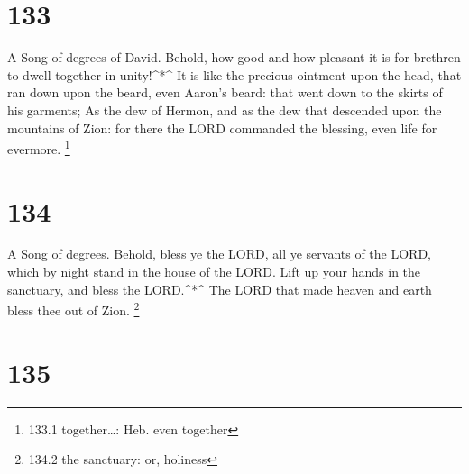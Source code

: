 \hypertarget{section-133}{%
\section{133}\label{section-133}}

A Song of degrees of David.  Behold, how good and how
pleasant it is for brethren to dwell together in unity!\^{}*\^{}
 It is like the precious ointment upon the head, that ran
down upon the beard, even Aaron's beard: that went down to the skirts of
his garments;  As the dew of Hermon, and as the dew that
descended upon the mountains of Zion: for there the LORD commanded the
blessing, even life for evermore. \footnote{133.1 together\ldots: Heb.
  even together}

\hypertarget{section-134}{%
\section{134}\label{section-134}}

A Song of degrees.  Behold, bless ye the LORD, all ye
servants of the LORD, which by night stand in the house of the LORD.
 Lift up your hands in the sanctuary, and bless the
LORD.\^{}*\^{}  The LORD that made heaven and earth bless
thee out of Zion. \footnote{134.2 the sanctuary: or, holiness}

\hypertarget{section-135}{%
\section{135}\label{section-135}}

